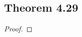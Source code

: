 \documentclass[../../main.tex]{subfiles}
\begin{document}
\subsection{Theorem 4.29}
\begin{wts}

\end{wts}
\begin{proof}

\end{proof}
\end{document}
